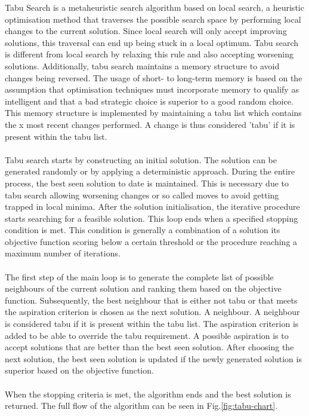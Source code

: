 Tabu Search is a metaheuristic search algorithm based on local search, a heuristic optimisation method that traverses the possible search space by performing local changes to the current solution. Since local search will only accept improving solutions, this traversal can end up being stuck in a local optimum. Tabu search is different from local search by relaxing this rule and also accepting worsening solutions. Additionally, tabu search maintains a memory structure to avoid changes being reversed. The usage of short- to long-term memory is  based on the assumption that optimisation techniques must incorporate memory to qualify as intelligent and that a bad strategic choice is superior to a good random choice\cite{glover1999}. This memory structure is implemented by maintaining a tabu list which contains the x most recent changes performed. A change is thus considered 'tabu' if it is present within the tabu list.
\\\\
Tabu search starts by constructing an initial solution. The solution can be generated randomly or by applying a deterministic approach. During the entire process, the best seen solution to date is maintained. This is necessary due to tabu search allowing worsening changes or so called moves to avoid getting trapped in local minima. After the solution initialisation, the iterative procedure starts searching for a feasible solution. This loop ends when  a specified stopping condition is met. This condition is generally a combination of a solution its objective function scoring below a certain threshold or the procedure reaching a maximum number of iterations.
\\\\
The first step of the main loop is to generate the complete list of possible neighbours of the current solution and ranking them based on the objective function. Subsequently, the best neighbour that is either not tabu or that meets the aspiration criterion is chosen as the next solution. A neighbour. A neighbour is considered tabu if it is present within the tabu list. The aspiration criterion is added to be able to override the tabu requirement. A possible aspiration is to accept solutions that are better than the best seen solution. After choosing the next solution, the best seen solution is updated if the newly generated solution is superior based on the objective function.
\\\\
When the stopping criteria is met, the algorithm ends and the best solution is returned. The full flow of the algorithm can be seen in Fig.\ref{fig:tabu-chart}.

